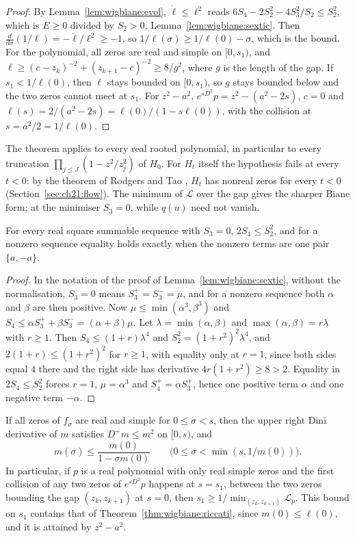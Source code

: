 \begin{proof}
By Lemma~\ref{lem:wigbiane:evol}, $\dot\ell\le\ell^2$ reads $6S_4-2S_2^2-4S_3^2/S_2\le S_2^2$, which is $E\ge0$ divided by $S_2>0$, Lemma~\ref{lem:wigbiane:sextic}. Then $\frac{d}{d\sigma}(1/\ell)=-\dot\ell/\ell^2\ge-1$, so $1/\ell(\sigma)\ge1/\ell(0)-\sigma$, which is the bound. For the polynomial, all zeros are real and simple on $[0,s_1)$, and $\ell\ge(c-z_k)^{-2}+(z_{k+1}-c)^{-2}\ge8/g^2$, where $g$ is the length of the gap. If $s_1<1/\ell(0)$, then $\ell$ stays bounded on $[0,s_1)$, so $g$ stays bounded below and the two zeros cannot meet at $s_1$. For $z^2-a^2$, $e^{sD^2}p=z^2-(a^2-2s)$, $c=0$ and $\ell(s)=2/(a^2-2s)=\ell(0)/(1-s\ell(0))$, with the collision at $s=a^2/2=1/\ell(0)$.
\end{proof}

The theorem applies to every real rooted polynomial, in particular to every truncation $\prod_{j\le J}(1-z^2/z_j^2)$ of $H_0$. For $H_t$ itself the hypothesis fails at every $t<0$: by the theorem of Rodgers and Tao \cite{RodgersTao}, $H_t$ has nonreal zeros for every $t<0$ (Section~\ref{sec:ch21:flow}). The minimum of $\mathcal L$ over the gap gives the sharper Biane form; at the minimiser $S_3=0$, while $q(u)$ need not vanish.

\begin{lemma}\label{lem:wigbiane:quartic}
For every real square summable sequence with $S_3=0$, $2S_4\le S_2^2$, and for a nonzero sequence equality holds exactly when the nonzero terms are one pair $\{a,-a\}$.
\end{lemma}

\begin{proof}
In the notation of the proof of Lemma~\ref{lem:wigbiane:sextic}, without the normalisation, $S_3=0$ means $S_3^+=S_3^-=\mu$, and for a nonzero sequence both $\alpha$ and $\beta$ are then positive. Now $\mu\le\min(\alpha^3,\beta^3)$ and $S_4\le\alpha S_3^++\beta S_3^-=(\alpha+\beta)\mu$. Let $\lambda=\min(\alpha,\beta)$ and $\max(\alpha,\beta)=r\lambda$ with $r\ge1$. Then $S_4\le(1+r)\lambda^4$ and $S_2^2=(1+r^2)^2\lambda^4$, and $2(1+r)\le(1+r^2)^2$ for $r\ge1$, with equality only at $r=1$, since both sides equal $4$ there and the right side has derivative $4r(1+r^2)\ge8>2$. Equality in $2S_4\le S_2^2$ forces $r=1$, $\mu=\alpha^3$ and $S_4^+=\alpha S_3^+$, hence one positive term $\alpha$ and one negative term $-\alpha$.
\end{proof}

\begin{theorem}\label{thm:wigbiane:biane2}
If all zeros of $f_\sigma$ are real and simple for $0\le\sigma<s$, then the upper right Dini derivative of $m$ satisfies $D^+m\le m^2$ on $[0,s)$, and
\[
m(\sigma)\le\frac{m(0)}{1-\sigma m(0)}\qquad\big(0\le\sigma<\min(s,1/m(0))\big).
\]
In particular, if $p$ is a real polynomial with only real simple zeros and the first collision of any two zeros of $e^{sD^2}p$ happens at $s=s_1$, between the two zeros bounding the gap $(z_k,z_{k+1})$ at $s=0$, then $s_1\ge1/\min_{(z_k,z_{k+1})}\mathcal L_p$. This bound on $s_1$ contains that of Theorem~\ref{thm:wigbiane:riccati}, since $m(0)\le\ell(0)$, and it is attained by $z^2-a^2$.
\end{theorem}

